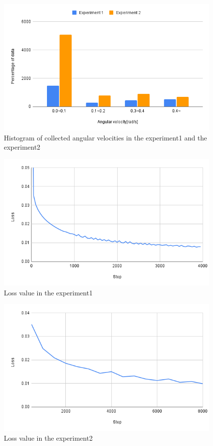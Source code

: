 \newpage
\begin{figure}[h]
  \centering
  \includegraphics[keepaspectratio, scale=0.53]{images/ang_sum.png}
  \caption{Histogram of collected angular velocities in the experiment1 and the experiment2}
  \label{Fig:hist}
  \end{figure}

\begin{figure}[h]
  \centering
  \includegraphics[keepaspectratio, scale=0.5]{images/exp3_4000_fix.png}
  \caption{Loss value in the experiment1}
  \label{Fig:exp2.2-4000}
  \end{figure}

\begin{figure}[h]
  \centering
  \includegraphics[keepaspectratio, scale=0.5]{images/exp3_8000.png}
  \caption{Loss value in the experiment2}
  \label{Fig:exp2.2-8000}
  \end{figure}

